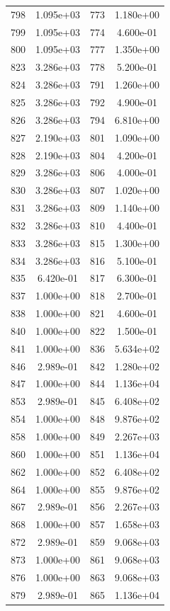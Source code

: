 \documentclass[12pt]{article}
\begin{document}
\begin{longtable}{@{}cccc@{}}
798 & 1.095e+03 & 773 & 1.180e+00 \\
799 & 1.095e+03 & 774 & 4.600e-01 \\
800 & 1.095e+03 & 777 & 1.350e+00 \\
823 & 3.286e+03 & 778 & 5.200e-01 \\
824 & 3.286e+03 & 791 & 1.260e+00 \\
825 & 3.286e+03 & 792 & 4.900e-01 \\
826 & 3.286e+03 & 794 & 6.810e+00 \\
827 & 2.190e+03 & 801 & 1.090e+00 \\
828 & 2.190e+03 & 804 & 4.200e-01 \\
829 & 3.286e+03 & 806 & 4.000e-01 \\
830 & 3.286e+03 & 807 & 1.020e+00 \\
831 & 3.286e+03 & 809 & 1.140e+00 \\
832 & 3.286e+03 & 810 & 4.400e-01 \\
833 & 3.286e+03 & 815 & 1.300e+00 \\
834 & 3.286e+03 & 816 & 5.100e-01 \\
835 & 6.420e-01 & 817 & 6.300e-01 \\
837 & 1.000e+00 & 818 & 2.700e-01 \\
838 & 1.000e+00 & 821 & 4.600e-01 \\
840 & 1.000e+00 & 822 & 1.500e-01 \\
841 & 1.000e+00 & 836 & 5.634e+02 \\
846 & 2.989e-01 & 842 & 1.280e+02 \\
847 & 1.000e+00 & 844 & 1.136e+04 \\
853 & 2.989e-01 & 845 & 6.408e+02 \\
854 & 1.000e+00 & 848 & 9.876e+02 \\
858 & 1.000e+00 & 849 & 2.267e+03 \\
860 & 1.000e+00 & 851 & 1.136e+04 \\
862 & 1.000e+00 & 852 & 6.408e+02 \\
864 & 1.000e+00 & 855 & 9.876e+02 \\
867 & 2.989e-01 & 856 & 2.267e+03 \\
868 & 1.000e+00 & 857 & 1.658e+03 \\
872 & 2.989e-01 & 859 & 9.068e+03 \\
873 & 1.000e+00 & 861 & 9.068e+03 \\
876 & 1.000e+00 & 863 & 9.068e+03 \\
879 & 2.989e-01 & 865 & 1.136e+04 \\

\end{longtable}
\end{document}
